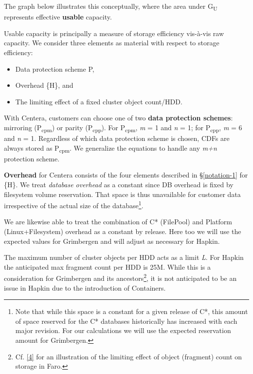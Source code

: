 The graph below illustrates this conceptually, where the area under G\textsubscript{U} represents effective \textbf{usable} capacity.

\begin{center}
\resizebox{.65\linewidth}{!}{}
\end{center}


Usable capacity is principally a measure of storage efficiency vis-à-vis raw capacity. We consider three elements as material with respect to storage efficiency:

\begin{itemize}
\tightlist
\item
  Data protection scheme P,
\item
  Overhead \{H\}, and
\item
  The limiting effect of a fixed cluster object count/HDD.
\end{itemize}

With Centera, customers can choose one of two \textbf{data protection schemes}: mirroring (P\textsubscript{cpm}) or parity (P\textsubscript{cpp}). For P\textsubscript{cpm}, \emph{m} = 1 and \emph{n} = 1; for P\textsubscript{cpp}, \emph{m} = 6 and \emph{n} = 1. Regardless of which data protection scheme is chosen, CDFs are always stored as P\textsubscript{cpm}. We generalize the equations to handle any \emph{m+n} protection scheme.

\textbf{Overhead} for Centera consists of the four elements described in §\ref{notation-1} for \{H\}. We treat \emph{database overhead }as a constant since DB overhead is fixed by filesystem volume reservation. That space is thus unavailable for customer data irrespective of the actual size of the database\footnote{ Note that while this space is a constant for a given release of C*, this amount of space reserved for the C* databases historically has increased with each major revision. For our calculations we will use the expected reservation amount for Grimbergen.}.

We are likewise able to treat the combination of C* (FilePool) and Platform (Linux+Filesystem) overhead as a constant by release. Here too we will use the expected values for Grimbergen and will adjust as necessary for Hapkin.

The maximum number of cluster objects per HDD acts as a limit \emph{L}. For Hapkin the anticipated max fragment count per HDD is 25M. While this is a consideration for Grimbergen and its ancestors\footnote{ Cf. \hyperref[ref:4]{[4]} for an illustration of the limiting effect of object (fragment) count on storage in Faro.}, it is not anticipated to be an issue in Hapkin due to the introduction of Containers.

